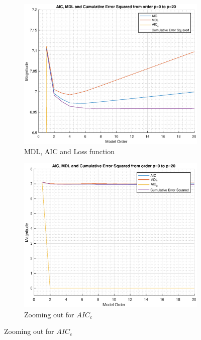 \begin{figure}[h!]
\centering
\begin{subfigure}{0.32\textwidth}
\centering
\includegraphics[width = \textwidth]{heart_mdl_t3_zoom}
\caption{MDL, AIC and Loss function}
\label{fig:heart_mdl_t3_zoom}
\end{subfigure}
\begin{subfigure}{0.32\textwidth}
\centering
\includegraphics[width = \textwidth]{heart_mdl_t3}
\caption{Zooming out for $AIC_c$}
\label{fig:heart_mdl_t3}
\end{subfigure}

\end{figure}
